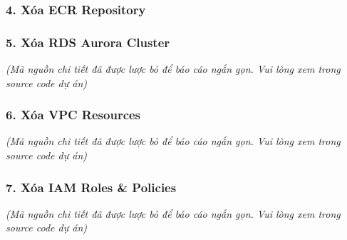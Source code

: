 \hypertarget{xuxf3a-ecr-repository}{%
\subsubsection{4. Xóa ECR Repository}}

\begin{Shaded}
\begin{Highlighting}[]
\DataTypeTok{\textbackslash{}}
  \DataTypeTok{\textbackslash{}}
   \VariableTok{$(}  \VariableTok{)} \DataTypeTok{\textbackslash{}}

 
\end{Highlighting}
\end{Shaded}

\hypertarget{xuxf3a-rds-aurora-cluster}{%
\subsubsection{5. Xóa RDS Aurora
Cluster}}

\emph{(Mã nguồn chi tiết đã được lược bỏ để báo cáo ngắn gọn. Vui lòng
xem trong source code dự án)}

\hypertarget{xuxf3a-vpc-resources}{%
\subsubsection{6. Xóa VPC Resources}}

\emph{(Mã nguồn chi tiết đã được lược bỏ để báo cáo ngắn gọn. Vui lòng
xem trong source code dự án)}

\hypertarget{xuxf3a-iam-roles-policies}{%
\subsubsection{7. Xóa IAM Roles \&
Policies}}

\emph{(Mã nguồn chi tiết đã được lược bỏ để báo cáo ngắn gọn. Vui lòng
xem trong source code dự án)}

